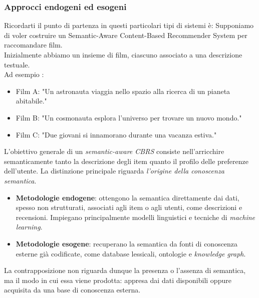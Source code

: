 \subsubsection{Approcci endogeni ed esogeni}
\begin{example}{}
Ricordarti il punto di partenza in questi particolari tipi di sistemi è:
Supponiamo di voler costruire un Semantic-Aware Content-Based Recommender System per raccomandare film. \\
Inizialmente abbiamo un insieme di film, ciascuno associato a una descrizione testuale. \\
Ad esempio : 
\begin{itemize}
    \item Film A: "Un astronauta viaggia nello spazio alla ricerca di un pianeta abitabile."
    \item Film B: "Un cosmonauta esplora l'universo per trovare un nuovo mondo."
    \item Film C: "Due giovani si innamorano durante una vacanza estiva."
\end{itemize}
\end{example}
L'obiettivo generale di un \emph{semantic-aware CBRS} consiste nell'arricchire semanticamente tanto la descrizione degli item quanto il profilo delle preferenze dell'utente. La distinzione principale riguarda \emph{l'origine della conoscenza semantica}.
\begin{itemize}
    \item \textbf{Metodologie endogene}: ottengono la semantica direttamente dai dati, spesso non strutturati, associati agli item o agli utenti, come descrizioni e recensioni. Impiegano principalmente modelli linguistici e tecniche di \emph{machine learning}.
    \item \textbf{Metodologie esogene}: recuperano la semantica da fonti di conoscenza esterne già codificate, come database lessicali, ontologie e \emph{knowledge graph}.
\end{itemize}
La contrapposizione non riguarda dunque la presenza o l'assenza di semantica, ma il modo in cui essa viene prodotta: appresa dai dati disponibili oppure acquisita da una base di conoscenza esterna.

